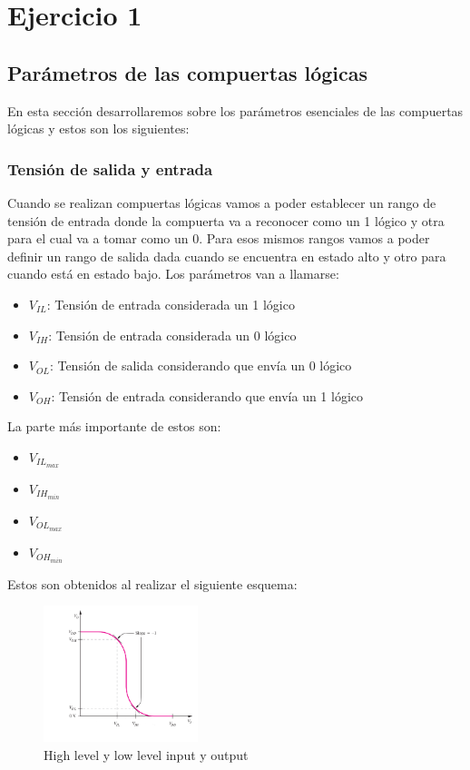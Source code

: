 \section{Ejercicio 1}

\subsection{Parámetros de las compuertas lógicas}
En esta sección desarrollaremos sobre los parámetros esenciales de las compuertas lógicas y estos son los siguientes:

\subsubsection{Tensión de salida y entrada}
Cuando se realizan compuertas lógicas vamos a poder establecer un rango de tensión de entrada donde la compuerta va a reconocer como un 1 lógico y otra para el cual va a tomar como un 0. Para esos mismos rangos vamos a poder definir un rango de salida dada cuando se encuentra en estado alto y otro para cuando está en estado bajo.
Los parámetros van a llamarse:
\begin{itemize}
	\item $V_{IL}$: Tensión de entrada considerada un 1 lógico
	\item $V_{IH}$: Tensión de entrada considerada un 0 lógico
	\item $V_{OL}$: Tensión de salida considerando que envía un 0 lógico
	\item $V_{OH}$: Tensión de entrada considerando que envía un 1 lógico
\end{itemize}
La parte más importante de estos son:
\begin{itemize}
	\item $V_{IL_{max}}$
	\item $V_{IH_{min}}$
	\item $V_{OL_{max}}$
	\item $V_{OH_{min}}$
\end{itemize}
Estos son obtenidos al realizar el siguiente esquema:
\begin{figure}[H]
	\centering
	\includegraphics[width=0.4\textwidth]{Ejercicio1/Tensiones.png}
	\caption{High level y low level input y output}
\end{figure}

